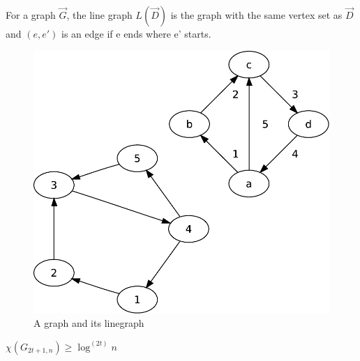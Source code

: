 \begin{Def} For a graph $\vec G$, the line graph $L(\vec D)$ is  the graph with the same vertex set as $\vec D$ and $(e,e')$ is an edge if e ends where e' starts. 

\begin{figure}[hbt]
\begin{center}
\includegraphics[width=0.8\linewidth]{./images/linegraph_ex}
\end{center}
\caption{A graph and its linegraph}
\end{figure}
\end{Def}

\begin{lem} $\chi(G_{2t+1,n}) \geq \log^{(2t)} n$\end{lem}

